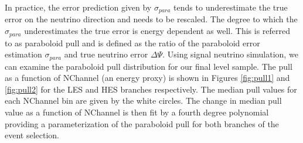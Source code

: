 \documentclass{gatech-thesis}
\begin{document}
In practice, the error prediction given by $\sigma_{para}$ tends to underestimate the true error on the neutrino direction and needs to be rescaled. The degree to which the $\sigma_{para}$ underestimates the true error is energy dependent as well. This is referred to as paraboloid pull and is defined as the ratio of the paraboloid error estimation $\sigma_{para}$ and true neutrino error $\Delta\Psi$. Using signal neutrino simulation, we can examine the paraboloid pull distribution for our final level sample. The pull as a function of NChannel (an energy proxy) is shown in Figures \ref{fig:pull1} and \ref{fig:pull2} for the LES and HES branches respectively. The median pull values for each NChannel bin are given by the white circles. The change in median pull value as a function of NChannel is then fit by a fourth degree polynomial providing a parameterization of the paraboloid pull for both branches of the event selection.
\end{document}
